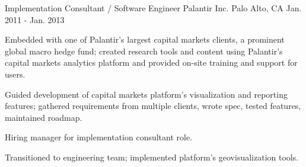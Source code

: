 \begin{cventries}
  \cventry
    {Implementation Consultant / Software Engineer} %
    {Palantir Inc.} %
    {Palo Alto, CA} %
    {Jan. 2011 - Jan. 2013} %
    {
      \begin{cvitems} %
        \item {Embedded with one of Palantir's largest capital markets clients, a prominent global macro hedge fund; created research tools and content using Palantir's capital markets analytics platform and provided on-site training and support for users.}
        \item {Guided development of capital markets platform's visualization and reporting features; gathered requirements from multiple clients, wrote spec, tested features, maintained roadmap.}
        \item {Hiring manager for implementation consultant role.}
        \item {Transitioned to engineering team; implemented platform's geovisualization tools.}
      \end{cvitems}
    }

\end{cventries}
